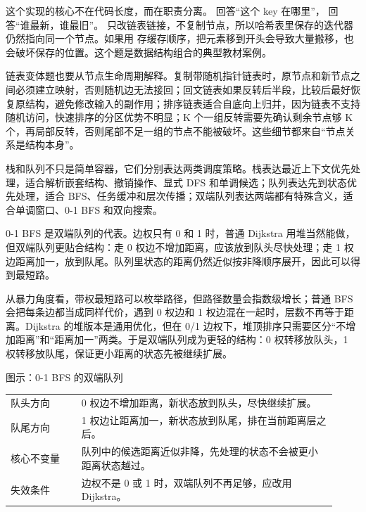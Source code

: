 这个实现的核心不在代码长度，而在职责分离。 回答“这个 key 在哪里”， 回答“谁最新，谁最旧”。 只改链表链接，不复制节点，所以哈希表里保存的迭代器仍然指向同一个节点。如果用  存缓存顺序，把元素移到开头会导致大量搬移，也会破坏保存的位置。这个题是数据结构组合的典型教材案例。

链表变体题也要从节点生命周期解释。复制带随机指针链表时，原节点和新节点之间必须建立映射，否则随机边无法接回；回文链表如果反转后半段，比较后最好恢复原结构，避免修改输入的副作用；排序链表适合自底向上归并，因为链表不支持随机访问，快速排序的分区优势不明显；K 个一组反转需要先确认剩余节点够 K 个，再局部反转，否则尾部不足一组的节点不能被破坏。这些细节都来自“节点关系是结构本身”。


栈和队列不只是简单容器，它们分别表达两类调度策略。栈表达最近上下文优先处理，适合解析嵌套结构、撤销操作、显式 DFS 和单调候选；队列表达先到状态优先处理，适合 BFS、任务缓冲和层次传播；双端队列表达两端都有特殊含义，适合单调窗口、0-1 BFS 和双向搜索。

0-1 BFS 是双端队列的代表。边权只有 0 和 1 时，普通 Dijkstra 用堆当然能做，但双端队列更贴合结构：走 0 权边不增加距离，应该放到队头尽快处理；走 1 权边距离加一，放到队尾。队列里状态的距离仍然近似按非降顺序展开，因此可以得到最短路。

从暴力角度看，带权最短路可以枚举路径，但路径数量会指数级增长；普通 BFS 会把每条边都当成同样代价，遇到 0 权边和 1 权边混在一起时，层数不再等于距离。Dijkstra 的堆版本是通用优化，但在 0/1 边权下，堆顶排序只需要区分“不增加距离”和“距离加一”两类。于是双端队列成为更轻的结构：0 权转移放队头，1 权转移放队尾，保证更小距离的状态先被继续扩展。

\begin{principlebox}{图示：0-1 BFS 的双端队列}
\begin{tabular}{@{}p{0.2\linewidth}p{0.72\linewidth}@{}}
队头方向 & 0 权边不增加距离，新状态放到队头，尽快继续扩展。\\
队尾方向 & 1 权边让距离加一，新状态放到队尾，排在当前距离层之后。\\
核心不变量 & 队列中的候选距离近似非降，先处理的状态不会被更小距离状态越过。\\
失效条件 & 边权不是 0 或 1 时，双端队列不再足够，应改用 Dijkstra。\\
\end{tabular}
\end{principlebox}

